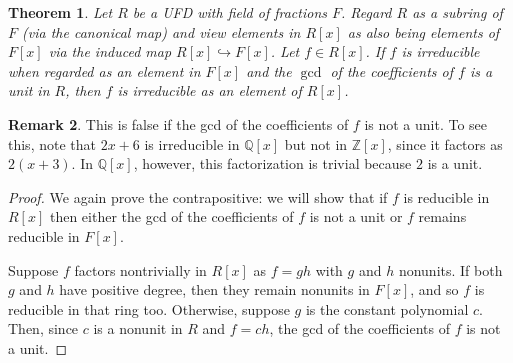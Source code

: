 \documentclass[12pt]{report}
\newtheorem{theorem}{Theorem}[chapter]
\numberwithin{equation}{section}
\numberwithin{theorem}{chapter}
\theoremstyle{definition}
\newtheorem*{basic properties}{Basic Properties}
\newtheorem*{Important Remark}{Important Remark}
\newtheorem{remark}[theorem]{Remark}
\begin{document}
\begin{theorem}
	Let $R$ be a UFD with field of fractions $F$. Regard $R$ as a subring of $F$ (via the canonical map) and view elements in $R[x]$ as also being elements of $F[x]$ via the induced map $R[x]\hookrightarrow F[x]$.
Let $f \in R[x]$. If $f$ is irreducible when regarded as an element   in $F[x]$ and the $\gcd$ of the coefficients of $f$ is a unit in $R$, then $f$ is  irreducible  as an element of $R[x]$.
\end{theorem}

\begin{remark}
This is false if the gcd of the coefficients of $f$ is not a unit. To see this, note that  $2x + 6$ is irreducible in $\mathbb{Q}[x]$ but not in $\mathbb{Z}[x]$, since it factors as $2(x+3)$. In $\mathbb{Q}[x]$, however, this factorization is trivial because $2$ is a unit. 
\end{remark}


\begin{proof}
We again prove the contrapositive: we will show that if $f$ is reducible in $R[x]$ then either the gcd of the coefficients of $f$ is not a unit or $f$ remains  reducible in $F[x]$. 

Suppose $f$ factors nontrivially in $R[x]$ as $f = g h$ with $g$ and $h$ nonunits.
If both $g$ and $h$ have positive degree, then they remain nonunits in $F[x]$, and so $f$  is reducible in that ring too. Otherwise, suppose $g$ is the constant polynomial $c$.
Then, since $c$ is a nonunit in $R$ and $f = c h$, the gcd of the coefficients of $f$ is not a unit. 
\end{proof}
\end{document}
